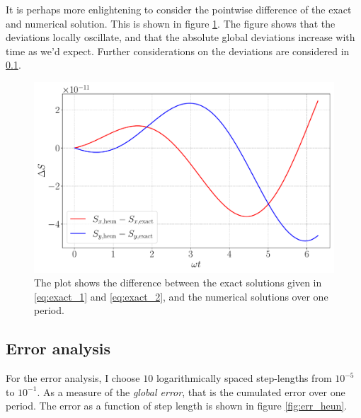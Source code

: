 It is perhaps more enlightening to consider the pointwise difference of the exact and numerical solution. This is shown in figure \ref{fig:comp_diff}. The figure shows that the deviations locally oscillate, and that the absolute global deviations increase with time as we'd expect. Further considerations on the deviations are considered in \ref{sec:error}.

\begin{figure}[htb]
	\centering
	\includegraphics[width=0.8\columnwidth]{../fig/comparison_diff.pdf}
	\caption{The plot shows the difference between the exact solutions given in \eqref{eq:exact_1} and \eqref{eq:exact_2}, and the numerical solutions over one period.}
	\label{fig:comp_diff}
\end{figure} 

\subsection{Error analysis}\label{sec:error}

For the error analysis, I choose $10$ logarithmically spaced step-lengths from $10^{-5}$ to $10^{-1}$. As a measure of the \textit{global error}, that is the cumulated error over one period. The error as a function of step length is shown in figure \ref{fig:err_heun}.

